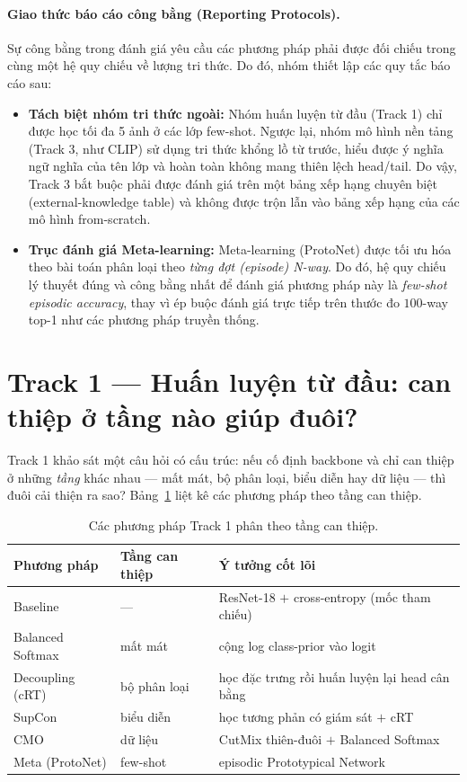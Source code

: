 \paragraph{Giao thức báo cáo công bằng (Reporting Protocols).} Sự công bằng trong đánh giá yêu cầu các phương pháp phải được đối chiếu trong cùng một hệ quy chiếu về lượng tri thức. Do đó, nhóm thiết lập các quy tắc báo cáo sau:
\begin{itemize}
    \item \textbf{Tách biệt nhóm tri thức ngoài:} Nhóm huấn luyện từ đầu (Track 1) chỉ được học tối đa 5 ảnh ở các lớp few-shot. Ngược lại, nhóm mô hình nền tảng (Track 3, như CLIP) sử dụng tri thức khổng lồ từ trước, hiểu được ý nghĩa ngữ nghĩa của tên lớp và hoàn toàn không mang thiên lệch head/tail. Do vậy, Track 3 bắt buộc phải được đánh giá trên một bảng xếp hạng chuyên biệt (external-knowledge table) và không được trộn lẫn vào bảng xếp hạng của các mô hình from-scratch.
    \item \textbf{Trục đánh giá Meta-learning:} Meta-learning (ProtoNet) được tối ưu hóa theo bài toán phân loại theo \emph{từng đợt (episode) N-way}. Do đó, hệ quy chiếu lý thuyết đúng và công bằng nhất để đánh giá phương pháp này là \emph{few-shot episodic accuracy}, thay vì ép buộc đánh giá trực tiếp trên thước đo $100$-way top-1 như các phương pháp truyền thống.
\end{itemize}

\section{Track 1 --- Huấn luyện từ đầu: can thiệp ở tầng nào giúp đuôi?}
\label{sec:track1}

Track 1 khảo sát một câu hỏi có cấu trúc: nếu cố định backbone và chỉ can thiệp ở những \emph{tầng}
khác nhau --- mất mát, bộ phân loại, biểu diễn hay dữ liệu --- thì đuôi cải thiện ra sao?
Bảng~\ref{tab:track1-map} liệt kê các phương pháp theo tầng can thiệp.

\begin{table}[H]
\centering
\caption{Các phương pháp Track 1 phân theo tầng can thiệp.}
\label{tab:track1-map}
\begin{tabular}{lll}
\toprule
\textbf{Phương pháp} & \textbf{Tầng can thiệp} & \textbf{Ý tưởng cốt lõi} \\
\midrule
Baseline & --- & ResNet-18 $+$ cross-entropy (mốc tham chiếu) \\
Balanced Softmax & mất mát & cộng log class-prior vào logit \\
Decoupling (cRT) & bộ phân loại & học đặc trưng rồi huấn luyện lại head cân bằng \\
SupCon & biểu diễn & học tương phản có giám sát $+$ cRT \\
CMO & dữ liệu & CutMix thiên-đuôi $+$ Balanced Softmax \\
Meta (ProtoNet) & few-shot & episodic Prototypical Network \\
\bottomrule
\end{tabular}
\end{table}

